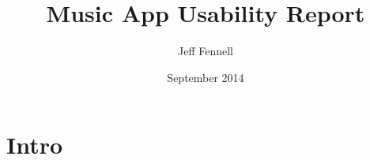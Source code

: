 \documentclass[12pt]{article}
\begin{document}
\title{Music App Usability Report}
\author{Jeff Fennell}
\date{September 2014}
\maketitle

\tableofcontents

\section{Intro}
\end{document}
